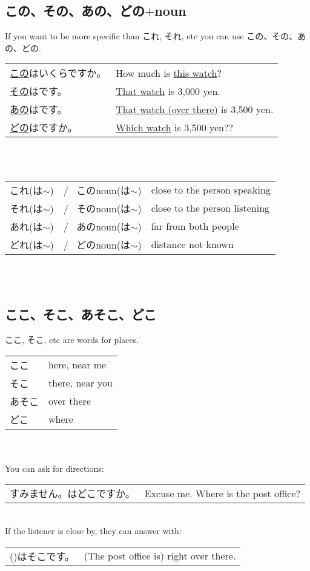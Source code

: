 \documentclass{article}
\newcommand{\grule}[2]{
	\,\\\-\quad 
	{\renewcommand{\arraystretch}{1.5}
	\begin{tabular}{|ll|}
		\hline
		#1 &\quad #2 \\
		\hline
	\end{tabular}
	}\\\\
}
\newenvironment{grules}
{
	\,\\\-\quad 
	\renewcommand{\arraystretch}{1.5}
	\begin{tabular}{|ll|}
		\hline
}
{
		\\ 
		\hline
	\end{tabular}
	\renewcommand{\arraystretch}{1}
	\\\\
}
\newenvironment{gex}
{
	\,\\
	\renewcommand{\arraystretch}{1.5}
    \begin{tabular}{m{20em} l}
}
{
	\end{tabular}
	\renewcommand{\arraystretch}{1}
	\\
}
\begin{document}
   \subsection{この、その、あの、どの$+$noun}
   If you want to be more specific than これ, それ, etc you can use この、その、あの、どの. 
   \begin{gex}
   \underline{この\ruby{時計}{とけえ}}はいくらですか。 & How much is \underline{this watch}? \\
   \underline{その\ruby{時計}{とけえ}}は\ruby{三}{さん}\ruby{千}{ぜん}\ruby{円}{えん}です。 & \underline{That watch} is 3,000 yen. \\
   \underline{あの\ruby{時計}{とけえ}}は\ruby{三}{さん}\ruby{千}{ぜん}\ruby{五}{ご}\ruby{百}{ひゃく}\ruby{円}{えん}です。 & \underline{That watch (over there)} is 3,500 yen. \\
   \underline{どの\ruby{時計}{とけえ}}は\ruby{三}{さん}\ruby{千}{ぜん}\ruby{五}{ご}\ruby{百}{ひゃく}\ruby{円}{えん}ですか。 & \underline{Which watch} is 3,500 yen??
   \end{gex}
   \begin{grules}
   これ(は$\sim$)\ \ / \ このnoun(は$\sim$) & close to the person speaking \\
   それ(は$\sim$)\ \ / \ そのnoun(は$\sim$) & close to the person listening \\
   あれ(は$\sim$)\ \ / \ あのnoun(は$\sim$) & far from both people\\
   どれ(は$\sim$)\ \ / \ どのnoun(は$\sim$) & distance not known
   \end{grules}
   
   
   \subsection{ここ、そこ、あそこ、どこ}
   ここ, そこ, etc are words for places.
   \begin{grules}
   ここ & here, near me \\
   そこ & there, near you \\
   あそこ & over there \\
   どこ & where
   \end{grules}
   You can ask for directions:
   \begin{gex}
   すみません。\ruby{郵便局}{ゆうびんきょく}はどこですか。 & Excuse me. Where is the post office?
   \end{gex}
   If the listener is close by, they can answer with:
   \begin{gex}
   (\ruby{郵便局}{ゆうびんきょく})はそこです。 & (The post office is) right over there.
   \end{gex}
   
\end{document}
